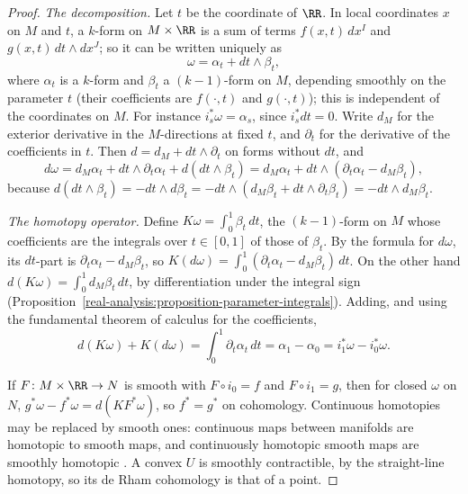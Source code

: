 \begin{proof}
\emph{The decomposition.} Let $t$ be the coordinate of $\RR$. In local coordinates $x$ on $M$ and $t$, a $k$-form on $M \times \RR$ is a sum of terms $f(x, t)\,dx^I$ and
$g(x, t)\,dt \wedge dx^J$; so it can be written uniquely as
\[
\omega = \alpha_t + dt \wedge \beta_t,
\]
where $\alpha_t$ is a $k$-form and $\beta_t$ a $(k-1)$-form on $M$, depending smoothly on the parameter $t$ (their coefficients are $f(\cdot, t)$ and $g(\cdot, t)$); this is
independent of the coordinates on $M$. For instance $i_s^*\omega = \alpha_s$, since $i_s^*dt = 0$. Write $d_M$ for the exterior derivative in the $M$-directions at fixed $t$, and
$\partial_t$ for the derivative of the coefficients in $t$. Then $d = d_M + dt \wedge \partial_t$ on forms without $dt$, and
\[
d\omega = d_M\alpha_t + dt \wedge \partial_t\alpha_t + d(dt \wedge \beta_t) = d_M\alpha_t + dt \wedge (\partial_t\alpha_t - d_M\beta_t),
\]
because $d(dt \wedge \beta_t) = -dt \wedge d\beta_t = -dt \wedge (d_M\beta_t + dt \wedge \partial_t\beta_t) = -dt \wedge d_M\beta_t$.

\emph{The homotopy operator.} Define $K\omega = \int_0^1\beta_t\,dt$, the $(k-1)$-form on $M$ whose coefficients are the integrals over $t \in [0, 1]$ of those of $\beta_t$. By the
formula for $d\omega$, its $dt$-part is $\partial_t\alpha_t - d_M\beta_t$, so $K(d\omega) = \int_0^1(\partial_t\alpha_t - d_M\beta_t)\,dt$. On the other hand
$d(K\omega) = \int_0^1d_M\beta_t\,dt$, by differentiation under the integral sign (Proposition~\ref{real-analysis:proposition-parameter-integrals}). Adding, and using the fundamental
theorem of calculus for the coefficients,
\[
d(K\omega) + K(d\omega) = \int_0^1\partial_t\alpha_t\,dt = \alpha_1 - \alpha_0 = i_1^*\omega - i_0^*\omega .
\]

If $F \colon M \times \RR \to N$ is smooth with $F \circ i_0 = f$ and $F \circ i_1 = g$, then for closed $\omega$ on $N$,
$g^*\omega - f^*\omega = d(K F^*\omega)$, so $f^* = g^*$ on cohomology. Continuous homotopies may be replaced by smooth ones: continuous maps between manifolds are homotopic to smooth maps, and continuously
homotopic smooth maps are smoothly homotopic \cite[Chapter 2]{hirsch-differential-topology}. A convex $U$ is smoothly contractible, by the straight-line homotopy, so its de Rham cohomology is that of a
point.
\end{proof}


